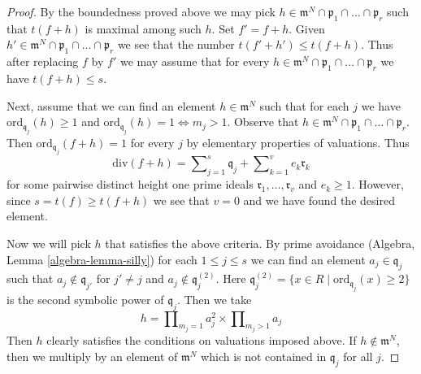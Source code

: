 \begin{proof}
\medskip\noindent
By the boundedness proved above we may pick
$h \in \mathfrak m^N \cap \mathfrak p_1 \cap \ldots \cap \mathfrak p_r$
such that $t(f + h)$ is maximal among such $h$. Set $f' = f + h$.
Given $h' \in \mathfrak m^N \cap \mathfrak p_1 \cap \ldots \cap \mathfrak p_r$
we see that the number $t(f' + h') \leq t(f + h)$.
Thus after replacing $f$ by $f'$ we may assume that for every
$h \in \mathfrak m^N \cap \mathfrak p_1 \cap \ldots \cap \mathfrak p_r$
we have $t(f + h) \leq s$.

\medskip\noindent
Next, assume that we can find an element $h \in \mathfrak m^N$ such that
for each $j$ we have $\text{ord}_{\mathfrak q_j}(h) \geq 1$ and
$\text{ord}_{\mathfrak q_j}(h) = 1 \Leftrightarrow m_j > 1$.
Observe that
$h \in \mathfrak m^N \cap \mathfrak p_1 \cap \ldots \cap \mathfrak p_r$.
Then $\text{ord}_{\mathfrak q_j}(f + h) = 1$
for every $j$ by elementary properties of valuations.
Thus
$$
\text{div}(f + h) = \sum\nolimits_{j = 1}^s \mathfrak q_j +
\sum\nolimits_{k = 1}^v e_k \mathfrak r_k
$$
for some pairwise distinct height one prime ideals
$\mathfrak r_1, \ldots, \mathfrak r_v$ and $e_k \geq 1$.
However, since $s = t(f) \geq t(f + h)$ we see that $v = 0$
and we have found the desired element.

\medskip\noindent
Now we will pick $h$ that satisfies the above criteria.
By prime avoidance (Algebra, Lemma \ref{algebra-lemma-silly})
for each $1 \leq j \leq s$ we can find an element $a_j \in \mathfrak q_j$
such that $a_j \not \in \mathfrak q_{j'}$ for $j' \not = j$
and $a_j \not \in \mathfrak q_j^{(2)}$. Here
$\mathfrak q_j^{(2)} = \{x \in R \mid \text{ord}_{\mathfrak q_j}(x) \geq 2\}$
is the second symbolic power of $\mathfrak q_j$.
Then we take
$$
h = \prod\nolimits_{m_j = 1} a_j^2 \times
\prod\nolimits_{m_j > 1} a_j
$$
Then $h$ clearly satisfies the conditions on valuations imposed above.
If $h \not \in \mathfrak m^N$, then we multiply by an element of
$\mathfrak m^N$ which is not contained in $\mathfrak q_j$ for all $j$.
\end{proof}